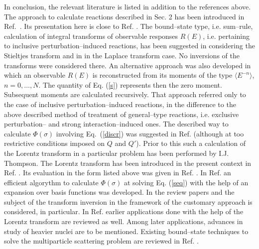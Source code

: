 \documentclass[12pt,ams,preprint,a4paper]{revtex4}
\begin{document}
In conclusion, the relevant literature is listed in addition to the references above. 
The approach to calculate reactions described in Sec. 2 has been introduced in Ref.~\cite{efr85}.
Its presentation here is close to Ref. \cite{efr99}.
The bound--state type, i.e. sum--rule, calculation of integral transforms  
of observable
responses $R(E)$, i.e. pertaining to inclusive perturbation--induced reactions,
   has been
 suggested in \cite{efr80} considering the Stieltjes transform 
and in \cite{lapl} in the Laplace transform case. No inversions of the transforms
were considered there. An alternative approach \cite{lang} was also developed in which
an observable
$R(E)$ is reconstructed from its moments of the type $\langle E^{-n}\rangle$, $n=0,\ldots,N$. 
The quantity of Eq. (\ref{s})
represents then the zero moment. Subsequent moments are calculated recursively. That approach 
referred only 
to the case of inclusive perturbation--induced reactions, in the difference to the above described method 
\cite{efr85} of treatment
of general--type reactions, i.e. exclusive  
perturbation-- and strong interaction--induced ones. 
The described way to calculate $\Phi(\sigma)$ involving Eq.~(\ref{discr}) was suggested
in Ref. \cite{efr99} (although at too restrictive conditions imposed on $Q$ and $Q'$). Prior to this  such
a calculation of the Lorentz transform in a particular problem has been performed by I.J. Thompson.
The Lorentz transform has been introduced in the present context in Ref. \cite{ELO94}.
Its evaluation in the form listed above was given in Ref. \cite{efr99}. 
In Ref. \cite{mar} an efficient
algorythm to calculate $\Phi(\sigma)$ at solving Eq. (\ref{seq}) with the help of 
an expansion over basis functions was developed. 
In the review papers \cite{efr99} and \cite{ELOB07} the subject of the transform inversion 
in the framework of the customary approach is
considered, in particular. In Ref. \cite{ELOB07}  earlier applications done
with the help of the Lorentz transform are reviewed as well. 
Among later applications,
advances in study of
heavier nuclei \cite{o16,c12} are to be mentioned. Existing bound--state techniques 
to solve the
multiparticle scattering problem  are reviewed in Ref. \cite{carb}.
 
\end{document}
